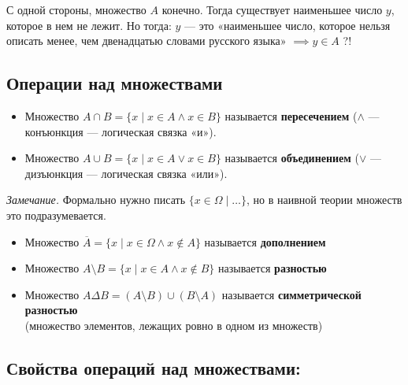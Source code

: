 \documentclass[10pt, a4paper]{article}
\begin{document}
\vspace{0.2cm}
\noindent С одной стороны, множество $A$ конечно. Тогда существует наименьшее число $y$, которое в нем не лежит. Но тогда: $y$ --- это «наименьшее число, которое нельзя описать менее, чем двенадцатью словами русского языка» $\implies y \in A$ \quad ?!

\vspace{0.3cm}
\subsection*{Операции над множествами}

\begin{itemize}
    \item Множество $A \cap B = \{ x \mid x \in A \land x \in B \}$ называется \textbf{пересечением} ($\land$ --- конъюнкция --- логическая связка «и»).
    \item Множество $A \cup B = \{ x \mid x \in A \lor x \in B \}$ называется \textbf{объединением} ($\lor$ --- дизъюнкция --- логическая связка «или»).
\end{itemize}

\vspace{0.2cm}
\noindent \textit{Замечание.} Формально нужно писать $\{ x \in \Omega \mid \dots \}$, но в наивной теории множеств это подразумевается.

\begin{itemize}
    \item Множество $\overline{A} = \{ x\mid  x \in \Omega \land x \notin A \}$ называется \textbf{дополнением}
    \item Множество $A \setminus B = \{ x \mid x \in A \land x \notin B \}$ называется \textbf{разностью}
    \item Множество $A \Delta B = (A \setminus B) \cup (B \setminus A)$ называется \textbf{симметрической разностью} \\
    \small (множество элементов, лежащих ровно в одном из множеств)
\end{itemize}

\vspace{0.2cm}
\subsection*{Свойства операций над множествами:}
\end{document}
